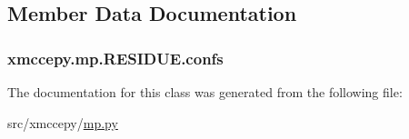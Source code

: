 \subsection{Member Data Documentation}
\hypertarget{classxmccepy_1_1mp_1_1_r_e_s_i_d_u_e_a9e276df72d318575591218b210b21ab2}{
\subsubsection[{confs}]{\setlength{\rightskip}{0pt plus 5cm}xmccepy.\-mp.\-R\-E\-S\-I\-D\-U\-E.\-confs}}\label{classxmccepy_1_1mp_1_1_r_e_s_i_d_u_e_a9e276df72d318575591218b210b21ab2}


The documentation for this class was generated from the following file\-:\begin{DoxyCompactItemize}
\item 
src/xmccepy/\hyperlink{mp_8py}{mp.\-py}\end{DoxyCompactItemize}

